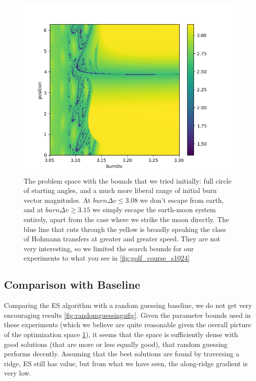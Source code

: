 \begin{figure}[ht]
    \centering
    \includegraphics[width=0.7\linewidth]{fig/golf_course_wide.png}
    \caption{The problem space with the bounds that we tried initially: full circle of starting angles, and a much more liberal range of initial burn vector magnitudes. At $burn \Delta v \leq 3.08$ we don't escape from earth, and at $burn \Delta v \geq 3.15$ we simply escape the earth-moon system entirely, apart from the case where we strike the moon directly. The blue line that cuts through the yellow is broadly speaking the class of Hohmann transfers at greater and greater speed. They are not very interesting, so we limited the search bounds for our experiments to what you see in \cref{fig:golf_course_s1024}}
    \label{fig:golf_course_wide}
\end{figure}

\subsection{Comparison with Baseline}
Comparing the ES algorithm with a random guessing baseline, we do not get very encouraging results \cref{fig:randomguessingufig}. Given the parameter bounds used in these experiments (which we believe are quite reasonable given the overall picture of the optimization space \cref{fig:golf_course_wide}), it seems that the space is sufficiently dense with good solutions (that are more or less equally good), that random guessing performs decently. Assuming that the best solutions are found by traversing a ridge, ES still has value, but from what we have seen, the along-ridge gradient is very low.


